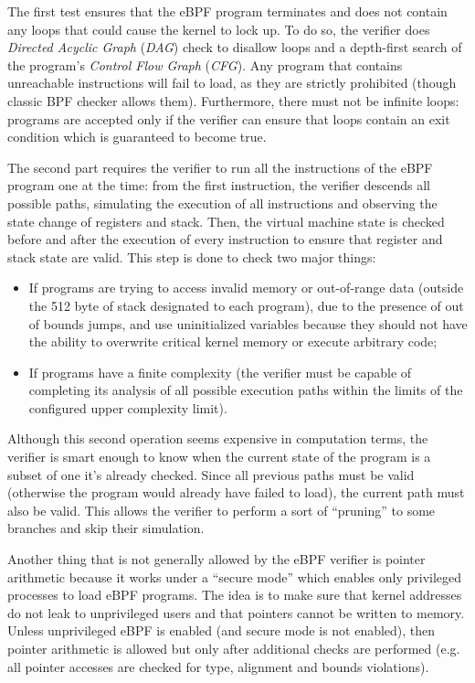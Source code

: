 The first test ensures that the eBPF program terminates and does not contain any loops that could cause the kernel to lock up. 
To do so, the verifier does \textit{Directed Acyclic Graph} (\textit{DAG}) check to disallow loops and a depth-first search of the program's \textit{Control Flow Graph} (\textit{CFG}). 
Any program that contains unreachable instructions will fail to load, as they are strictly prohibited (though classic BPF checker allows them).
Furthermore, there must not be infinite loops: programs are accepted only if the verifier can ensure that loops contain an exit condition which is guaranteed to become true.

The second part requires the verifier to run all the instructions of the eBPF program one at the time: from the first instruction, the verifier descends all possible paths, simulating the execution of all instructions and observing the state change of registers and stack.
Then, the virtual machine state is checked before and after the execution of every instruction to ensure that register and stack state are valid. 
This step is done to check two major things: 

\begin{itemize}
	\item 
		If programs are trying to access invalid memory or out-of-range data (outside the 512 byte of stack designated to each program), due to	the presence of out of bounds jumps, and use uninitialized variables because they should not have the ability to overwrite critical kernel memory or execute arbitrary code;
	\item 
		If programs have a finite complexity (the verifier must be capable of completing its analysis of all possible execution paths within the limits of the configured upper complexity limit).
\end{itemize}

Although this second operation seems expensive in computation terms, the verifier is smart enough to know when the current state of the program is a subset of one it's already checked. 
Since all previous paths must be valid (otherwise the program would already have failed to load), the current path must also be valid. 
This allows the verifier to perform a sort of ``pruning'' to some branches and skip their simulation.

Another thing that is not generally allowed by the eBPF verifier is pointer arithmetic because it works under a ``secure mode'' which enables only privileged processes to load eBPF programs.
The idea is to make sure that kernel addresses do not leak to unprivileged users and that pointers cannot be written to memory. 
Unless unprivileged eBPF is enabled (and secure mode is not enabled), then pointer arithmetic is allowed but only after additional checks are performed (e.g. all pointer accesses are checked for type, alignment and bounds violations).

